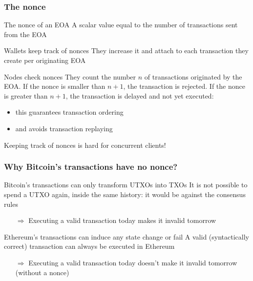 \documentclass[11pt]{beamer}  %
\begin{document}
\begin{frame}\frametitle{The nonce}

  \begin{greenbox}{The nonce of an EOA}
    A scalar value equal to the number of transactions sent from the EOA
  \end{greenbox}

  \bigskip

  \begin{greenbox}{Wallets keep track of nonces}
    They increase it and attach to each transaction they create per
    originating EOA
  \end{greenbox}

  \bigskip

  \begin{greenbox}{Nodes check nonces}
    They count the number $n$ of transactions originated
    by the EOA. If the nonce is smaller than $n+1$, the
    transaction is rejected. If the nonce is greater than $n+1$,
    the transaction is delayed and not yet executed:
    \begin{itemize}
    \item this guarantees transaction ordering
    \item and avoids transaction replaying
    \end{itemize}
  \end{greenbox}

  \bigskip

  \begin{redbox}{}
    \begin{center}
      Keeping track of nonces is hard for concurrent clients!
    \end{center}
  \end{redbox}

\end{frame}

\begin{frame}\frametitle{Why Bitcoin's transactions have no nonce?}

  \begin{greenbox}{Bitcoin's transactions can only transform UTXOs into TXOs}
    It is not possible to spend a UTXO again, inside the same history:
    it would be against the consensus rules
    \begin{itemize}
    \item[$\Rightarrow$] Executing a valid transaction today makes it invalid tomorrow
    \end{itemize}
  \end{greenbox}

  \bigskip

  \begin{greenbox}{Ethereum's transactions can induce any state change or fail}
    A valid (syntactically correct) transaction can always be executed in Ethereum
    \begin{itemize}
    \item[$\Rightarrow$] Executing a valid transaction today doesn't make it invalid tomorrow
      \alert{(without a nonce)}
    \end{itemize}
  \end{greenbox}

\end{frame}
\end{document}
